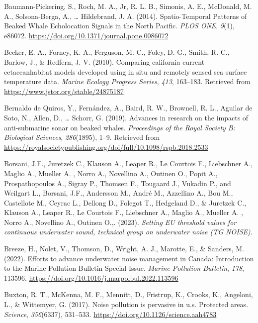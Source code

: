 \documentclass[
]{article}
\newlength{\cslhangindent}
\newlength{\cslentryspacingunit} %
\newenvironment{CSLReferences}[2] %
 {%
  \setlength{\parindent}{0pt}
  \ifodd #1
  \let\oldpar\par
  \def\par{\hangindent=\cslhangindent\oldpar}
  \fi
  \setlength{\parskip}{#2\cslentryspacingunit}
 }%
 {}
\begin{document}
\begin{CSLReferences}{1}{0}
\leavevmode{}%
Baumann-Pickering, S., Roch, M. A., Jr, R. L. B., Simonis, A. E.,
McDonald, M. A., Solsona-Berga, A., \ldots{} Hildebrand, J. A. (2014).
Spatio-Temporal Patterns of Beaked Whale Echolocation Signals in the
North Pacific. \emph{PLOS ONE}, \emph{9}(1), e86072.
\url{https://doi.org/10.1371/journal.pone.0086072}

\leavevmode{}%
Becker, E. A., Forney, K. A., Ferguson, M. C., Foley, D. G., Smith, R.
C., Barlow, J., \& Redfern, J. V. (2010). Comparing california current
cetacean{\textendash}habitat models developed using in situ and remotely
sensed sea surface temperature data. \emph{Marine Ecology Progress
Series}, \emph{413}, 163--183. Retrieved from
\url{https://www.jstor.org/stable/24875187}

\leavevmode{}%
Bernaldo de Quiros, Y., Fernández, A., Baird, R. W., Brownell, R. L.,
Aguilar de Soto, N., Allen, D., \ldots{} Schorr, G. (2019). Advances in
research on the impacts of anti-submarine sonar on beaked whales.
\emph{Proceedings of the Royal Society B: Biological Sciences},
\emph{286}(1895), 1--9. Retrieved from
\url{https://royalsocietypublishing.org/doi/full/10.1098/rspb.2018.2533}

\leavevmode{}%
Borsani, J.F., Juretzek C., Klauson A., Leaper R., Le Courtois F.,
Liebschner A., Maglio A., Mueller A. , Norro A., Novellino A., Outinen
O., Popit A., Prospathopoulos A., Sigray P., Thomsen F., Tougaard J.,
Vukadin P., and Weilgart L., Borsani, J.F., Andersson M., André M.,
Azzellino A., Bou M., Castellote M., Ceyrac L., Dellong D., Folegot T.,
Hedgeland D., \& Juretzek C., Klauson A., Leaper R., Le Courtois F.,
Liebschner A., Maglio A., Mueller A. , Norro A., Novellino A., Outinen
O.,. (2023). \emph{Setting EU threshold values for continuous underwater
sound, technical group on underwater noise (TG NOISE)}.

\leavevmode{}%
Breeze, H., Nolet, V., Thomson, D., Wright, A. J., Marotte, E., \&
Sanders, M. (2022). Efforts to advance underwater noise management in
Canada: Introduction to the Marine Pollution Bulletin Special Issue.
\emph{Marine Pollution Bulletin}, \emph{178}, 113596.
\url{https://doi.org/10.1016/j.marpolbul.2022.113596}

\leavevmode{}%
Buxton, R. T., McKenna, M. F., Mennitt, D., Fristrup, K., Crooks, K.,
Angeloni, L., \& Wittemyer, G. (2017). Noise pollution is pervasive in
u.s. Protected areas. \emph{Science}, \emph{356}(6337), 531--533.
\url{https://doi.org/10.1126/science.aah4783}


\end{CSLReferences}
\end{document}
